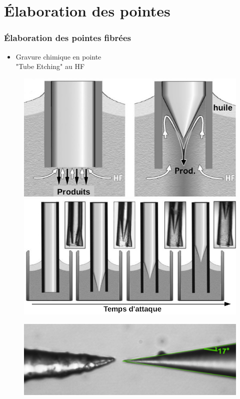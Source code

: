 \documentclass[9pt,a9paper,handout]{beamer}
\begin{document}
\section{Élaboration des pointes}
    \begin{frame}
        \frametitle{Élaboration des pointes fibrées}
        \begin{itemize}
            \item Gravure chimique en pointe\\
            \qquad "Tube Etching" au HF
        \end{itemize}

        \begin{figure}[h]\centering
            \includegraphics[width=.4\textwidth]{Images/Schemas/gravure}
            \hspace*{3mm}
            \includegraphics[width=.4\textwidth]{Images/Schemas/gravure_2}
        \end{figure}
        \vspace*{1cm}

        \begin{figure}[h]\centering
            \includegraphics[width=.55\textwidth]{Images/PhotosPointes/Nues_ok_et_abimee}
        \end{figure}
    \end{frame}
\end{document}
